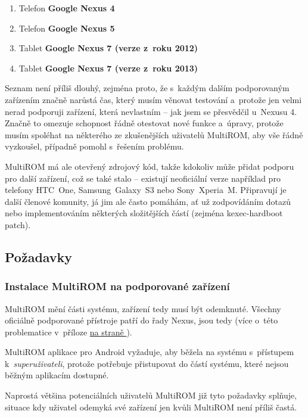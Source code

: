 \documentclass[12pt, a4paper, oneside]{article}
\newcommand{\B}{\textbf} %
\newcommand{\It}{\textit}  %
\newcommand*{\attref}[1]{\hyperref[{#1}]{\uv{\nameref*{#1}} na straně \pageref{#1}}}
\begin{document}
\begin{enumerate}
    \item Telefon \B{Google Nexus 4}
    \item Telefon \B{Google Nexus 5}
    \item Tablet \B{Google Nexus 7 (verze z~roku 2012)}
    \item Tablet \B{Google Nexus 7 (verze z~roku 2013)}
\end{enumerate}

Seznam není příliš dlouhý, zejména proto, že s~každým dalším podporovaným zařízením značně narůstá čas, který musím věnovat testování a~protože jen velmi nerad podporuji zařízení, která nevlastním -- jak jsem se přesvědčil u~Nexusu 4. Značně to omezuje schopnost řádně otestovat nové funkce a~úpravy, protože musím spoléhat na některého ze zkušenějších uživatelů MultiROM, aby vše řádně vyzkoušel, případně pomohl s~řešením problému.

MultiROM má ale otevřený zdrojový kód, takže kdokoliv může přidat podporu pro další zařízení, což se také stalo -- existují neoficiální verze například pro telefony HTC~One, Samsung~Galaxy~S3 nebo Sony~Xperia~M. Připravují je další členové komunity, já jim ale často pomáhám, ať už zodpovídáním dotazů nebo implementováním některých složitějších částí (zejména kexec-hardboot patch).

\subsection{Požadavky}
\subsubsection{Instalace MultiROM na podporované zařízení}
MultiROM mění části systému, zařízení tedy musí být odemknuté. Všechny oficiálně podporované přístroje patří do řady Nexus, jsou tedy  (více o~této problematice v~příloze \attref{sec:locked}).

MultiROM aplikace pro Android vyžaduje, aby běžela na systému s~přístupem k~\It{superuživateli}, protože potřebuje přistupovat do částí systému, které nejsou běžným aplikacím dostupné.

Naprostá většina potenciálních uživatelů MultiROM již tyto požadavky splňuje, situace kdy uživatel odemyká své zařízení jen kvůli MultiROM není příliš častá.
\end{document}
